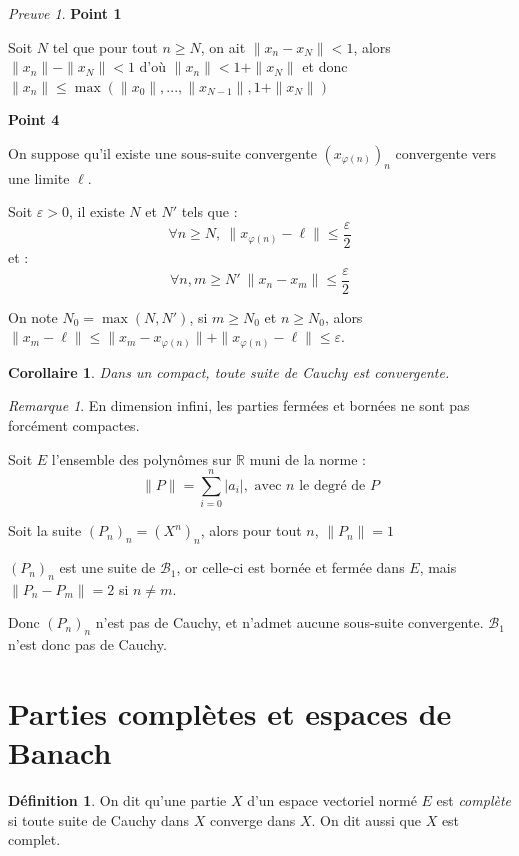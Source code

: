 \documentclass[]{article}
\newtheorem{mycor}{Corollaire}
\theoremstyle{remark}
\newtheorem{myrem}{Remarque}
\newtheorem{myproof}{Preuve}
\theoremstyle{definition}
\newtheorem{mydef}{Définition}
\newenvironment{proofpart}[1]{
	\noindent
	{\textbf{\boldmath #1}}
}{
	\checkmark
}
\begin{document}
\begin{myproof}
	\begin{proofpart}{Point 1}
		Soit $N$ tel que pour tout $n \geqslant N$, on ait $\|x_n - x_N\| < 1$, alors $\|x_n\| - \|x_N\|< 1$ d'où $\|x_n\| < 1 + \|x_N\|$
		et donc $\|x_n\| \leqslant \max (\|x_0\|, ..., \|x_{N-1}\|, 1 + \|x_N\|)$
	\end{proofpart}
	
	\begin{proofpart}{Point 4}
		On suppose qu'il existe une sous-suite convergente $(x_{\varphi(n)})_n$ convergente vers une limite $\ell$.
		
		Soit $\varepsilon > 0$, il existe $N$ et $N'$ tels que : $$\forall n \geqslant N, ~ \|x_{\varphi(n)} - \ell\| \leqslant \frac{\varepsilon}{2}$$
		et :
		$$\forall n, m \geqslant N' ~ \|x_n - x_m\| \leqslant \frac{\varepsilon}{2}$$
		
		On note $N_0 = \max (N, N')$, si $m \geqslant N_0$ et $n \geqslant N_0$, alors $\|x_m - \ell\| \leqslant \|x_m - x_{\varphi(n)}\| + \|x_{\varphi(n)} - \ell\| \leqslant \varepsilon$.
	\end{proofpart}
\end{myproof}

\begin{mycor}
	Dans un compact, toute suite de Cauchy est convergente.
\end{mycor}

\begin{myrem}
	En dimension infini, les parties fermées et bornées ne sont pas forcément compactes.
	
	Soit $E$ l'ensemble des polynômes sur $\mathbb{R}$ muni de la norme :
	$$\|P\| = \sum_{i=0}^{n} |a_i|, \text{ avec } n \text{ le degré de } P$$
	
	Soit la suite $(P_n)_n = (X^n)_n$, alors pour tout $n$, $\|P_n\|=1$
	
	$(P_n)_n$ est une suite de $\mathcal{B}_1$, or celle-ci est bornée et fermée dans $E$, mais $\|P_n-P_m\| = 2$ si $n \neq m$.
	
	Donc $(P_n)_n$ n'est pas de Cauchy, et n'admet aucune sous-suite convergente. $\mathcal{B}_1$ n'est donc pas de Cauchy.
\end{myrem}

\section{Parties complètes et espaces de Banach}

\begin{mydef}
	On dit qu'une partie $X$ d'un espace vectoriel normé $E$ est \textit{complète} si toute suite de Cauchy dans $X$ converge dans $X$. On dit aussi que $X$ est complet.
\end{mydef}
\end{document}
